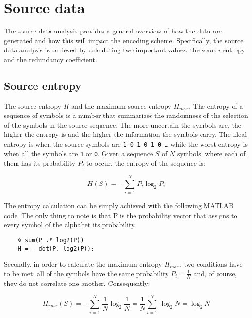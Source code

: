 \section{Source data}

The source data analysis provides a general overview of how the data are generated and how this will impact the encoding scheme. Specifically, the source data analysis is achieved by calculating two important values: the source entropy and the redundancy coefficient.

\subsection{Source entropy}

The source entropy $H$ and the maximum source entropy $H_{max}$. The entropy of a sequence of symbols is a number that summarizes the randomness of the selection of the symbols in the source sequence. The more uncertain the symbols are, the higher the entropy is and the higher the information the symbols carry. The ideal entropy is when the source symbols are \texttt{1 0 1 0 1 0 \dots} while the worst entropy is when all the symbols are \texttt{1} or \texttt{0}. Given a sequence $S$ of $N$ symbols, where each of them has its probability $P_i$ to occur, the entropy of the sequence is:

\begin{equation*}
    H(S) = - \sum_{i = 1}^{N}\,P_i \log_2 P_i
\end{equation*}

\noindent The entropy calculation can be simply achieved with the following MATLAB code. The only thing to note is that P is the probability vector that assigns to every symbol of the alphabet its probability. 

\begin{lstlisting}  
    % sum(P .* log2(P))
    H = - dot(P, log2(P));
\end{lstlisting}

\noindent Secondly, in order to calculate the maximum entropy $H_{max}$, two conditions have to be met: all of the symbols have the same probability $P_i = \frac{1}{N}$ and, of course, they do not correlate one another. Consequently:

\begin{equation*}
    H_{max}(S) = - \sum_{i = 1}^{N}\,\frac{1}{N} \log_2 \frac{1}{N} = \frac{1}{N} \sum_{i = 1}^{N}\, \log_2 N = \log_2N
\end{equation*}


